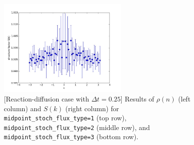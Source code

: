 \documentclass{article}
\begin{document}
\begin{figure}
\includegraphics[width=0.5\linewidth,height=1.9in]{fig1/react_dt0.25_Sk_mid3.jpg}
\caption{\label{fig_react_dt0.25_mid_type}[Reaction-diffusion case with $\Delta t=0.25$] Results of $\rho(n)$ (left column) and $S(k)$ (right column) for \texttt{midpoint\_stoch\_flux\_type=1} (top row), \texttt{midpoint\_stoch\_flux\_type=2} (middle row), and \texttt{midpoint\_stoch\_flux\_type=3} (bottom row).
}
\end{figure}
\end{document}
